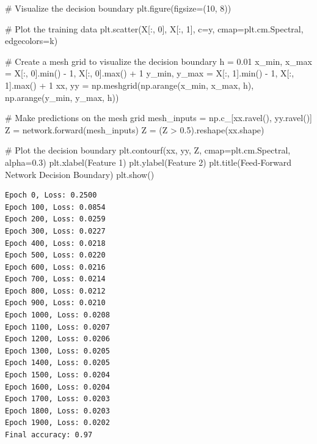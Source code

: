 \documentclass[
  letterpaper,
  DIV=11,
  numbers=noendperiod]{scrreprt}
\newenvironment{Shaded}{\begin{snugshade}}{\end{snugshade}}
\newcommand{\BuiltInTok}[1]{\textcolor[rgb]{0.00,0.23,0.31}{#1}}
\newcommand{\CommentTok}[1]{\textcolor[rgb]{0.37,0.37,0.37}{#1}}
\newcommand{\DecValTok}[1]{\textcolor[rgb]{0.68,0.00,0.00}{#1}}
\newcommand{\FloatTok}[1]{\textcolor[rgb]{0.68,0.00,0.00}{#1}}
\newcommand{\NormalTok}[1]{\textcolor[rgb]{0.00,0.23,0.31}{#1}}
\newcommand{\OperatorTok}[1]{\textcolor[rgb]{0.37,0.37,0.37}{#1}}
\newcommand{\StringTok}[1]{\textcolor[rgb]{0.13,0.47,0.30}{#1}}
\begin{document}
\begin{Shaded}
\begin{Highlighting}[]
\CommentTok{\# Visualize the decision boundary}
\NormalTok{plt.figure(figsize}\OperatorTok{=}\NormalTok{(}\DecValTok{10}\NormalTok{, }\DecValTok{8}\NormalTok{))}

\CommentTok{\# Plot the training data}
\NormalTok{plt.scatter(X[:, }\DecValTok{0}\NormalTok{], X[:, }\DecValTok{1}\NormalTok{], c}\OperatorTok{=}\NormalTok{y, cmap}\OperatorTok{=}\NormalTok{plt.cm.Spectral, edgecolors}\OperatorTok{=}\StringTok{\textquotesingle{}k\textquotesingle{}}\NormalTok{)}

\CommentTok{\# Create a mesh grid to visualize the decision boundary}
\NormalTok{h }\OperatorTok{=} \FloatTok{0.01}
\NormalTok{x\_min, x\_max }\OperatorTok{=}\NormalTok{ X[:, }\DecValTok{0}\NormalTok{].}\BuiltInTok{min}\NormalTok{() }\OperatorTok{{-}} \DecValTok{1}\NormalTok{, X[:, }\DecValTok{0}\NormalTok{].}\BuiltInTok{max}\NormalTok{() }\OperatorTok{+} \DecValTok{1}
\NormalTok{y\_min, y\_max }\OperatorTok{=}\NormalTok{ X[:, }\DecValTok{1}\NormalTok{].}\BuiltInTok{min}\NormalTok{() }\OperatorTok{{-}} \DecValTok{1}\NormalTok{, X[:, }\DecValTok{1}\NormalTok{].}\BuiltInTok{max}\NormalTok{() }\OperatorTok{+} \DecValTok{1}
\NormalTok{xx, yy }\OperatorTok{=}\NormalTok{ np.meshgrid(np.arange(x\_min, x\_max, h),}
\NormalTok{                     np.arange(y\_min, y\_max, h))}

\CommentTok{\# Make predictions on the mesh grid}
\NormalTok{mesh\_inputs }\OperatorTok{=}\NormalTok{ np.c\_[xx.ravel(), yy.ravel()]}
\NormalTok{Z }\OperatorTok{=}\NormalTok{ network.forward(mesh\_inputs)}
\NormalTok{Z }\OperatorTok{=}\NormalTok{ (Z }\OperatorTok{\textgreater{}} \FloatTok{0.5}\NormalTok{).reshape(xx.shape)}

\CommentTok{\# Plot the decision boundary}
\NormalTok{plt.contourf(xx, yy, Z, cmap}\OperatorTok{=}\NormalTok{plt.cm.Spectral, alpha}\OperatorTok{=}\FloatTok{0.3}\NormalTok{)}
\NormalTok{plt.xlabel(}\StringTok{\textquotesingle{}Feature 1\textquotesingle{}}\NormalTok{)}
\NormalTok{plt.ylabel(}\StringTok{\textquotesingle{}Feature 2\textquotesingle{}}\NormalTok{)}
\NormalTok{plt.title(}\StringTok{\textquotesingle{}Feed{-}Forward Network Decision Boundary\textquotesingle{}}\NormalTok{)}
\NormalTok{plt.show()}
\end{Highlighting}
\end{Shaded}

\begin{verbatim}
Epoch 0, Loss: 0.2500
Epoch 100, Loss: 0.0854
Epoch 200, Loss: 0.0259
Epoch 300, Loss: 0.0227
Epoch 400, Loss: 0.0218
Epoch 500, Loss: 0.0220
Epoch 600, Loss: 0.0216
Epoch 700, Loss: 0.0214
Epoch 800, Loss: 0.0212
Epoch 900, Loss: 0.0210
Epoch 1000, Loss: 0.0208
Epoch 1100, Loss: 0.0207
Epoch 1200, Loss: 0.0206
Epoch 1300, Loss: 0.0205
Epoch 1400, Loss: 0.0205
Epoch 1500, Loss: 0.0204
Epoch 1600, Loss: 0.0204
Epoch 1700, Loss: 0.0203
Epoch 1800, Loss: 0.0203
Epoch 1900, Loss: 0.0202
Final accuracy: 0.97
\end{verbatim}
\end{document}
